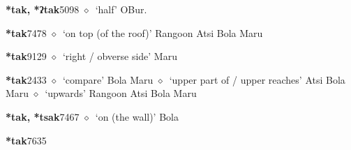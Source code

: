   \begin{list}{}{\leftmargin=1.5em \itemindent=-1.5em}
  \item {\footnotesize \textbf{*tak, *ʔtak}}{\tiny 5098}
         $\diamond$~`half'
         OBur. 
  \item {\footnotesize \textbf{*tak}}{\tiny 7478}
\hspace{1ex}
         $\diamond$~`on top (of the roof)'
         Rangoon 
\hspace{1ex}
         Atsi 
\hspace{1ex}
         Bola 
\hspace{1ex}
         Maru 
  \item {\footnotesize \textbf{*tak}}{\tiny 9129}
\hspace{1ex}
         $\diamond$~`right / obverse side'
         Maru 
  \item {\footnotesize \textbf{*tak}}{\tiny 2433}
\hspace{1ex}
         $\diamond$~`compare'
         Bola 
\hspace{1ex}
         Maru 
\hspace{1ex}
         $\diamond$~`upper part of / upper reaches'
         Atsi 
\hspace{1ex}
         Bola 
\hspace{1ex}
         Maru 
\hspace{1ex}
         $\diamond$~`upwards'
         Rangoon 
\hspace{1ex}
         Atsi 
\hspace{1ex}
         Bola 
\hspace{1ex}
         Maru 
  \item {\footnotesize \textbf{*tak, *tsak}}{\tiny 7467}
\hspace{1ex}
         $\diamond$~`on (the wall)'
         Bola 
  \item {\footnotesize \textbf{*tak}}{\tiny 7635}

\end{list}
